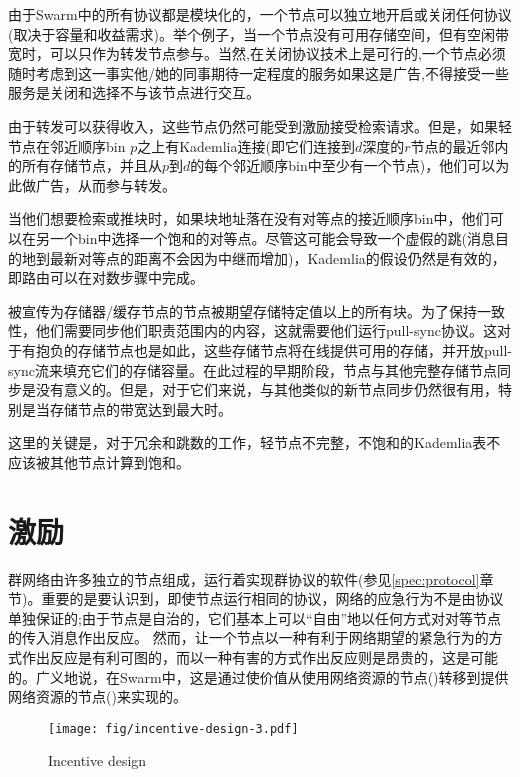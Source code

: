 由于Swarm中的所有协议都是模块化的，一个节点可以独立地开启或关闭任何协议(取决于容量和收益需求)。举个例子，当一个节点没有可用存储空间，但有空闲带宽时，可以只作为转发节点参与。当然,在关闭协议技术上是可行的,一个节点必须随时考虑到这一事实他/她的同事期待一定程度的服务如果这是广告,不得接受一些服务是关闭和选择不与该节点进行交互。 

由于转发可以获得收入，这些节点仍然可能受到激励接受检索请求。但是，如果轻节点在邻近顺序bin $p$之上有Kademlia连接(即它们连接到$d$深度的$r$节点的最近邻内的所有存储节点，并且从$p$到$d$的每个邻近顺序bin中至少有一个节点)，他们可以为此做广告，从而参与转发。 

当他们想要检索或推块时，如果块地址落在没有对等点的接近顺序bin中，他们可以在另一个bin中选择一个饱和的对等点。尽管这可能会导致一个虚假的跳(消息目的地到最新对等点的距离不会因为中继而增加)，Kademlia的假设仍然是有效的，即路由可以在对数步骤中完成。

被宣传为存储器/缓存节点的节点被期望存储特定值以上的所有块。为了保持一致性，他们需要同步他们职责范围内的内容，这就需要他们运行pull-sync协议。这对于有抱负的存储节点也是如此，这些存储节点将在线提供可用的存储，并开放pull-sync流来填充它们的存储容量。在此过程的早期阶段，节点与其他完整存储节点同步是没有意义的。但是，对于它们来说，与其他类似的新节点同步仍然很有用，特别是当存储节点的带宽达到最大时。

这里的关键是，对于冗余和跳数的工作，轻节点不完整，不饱和的Kademlia表不应该被其他节点计算到饱和。


\chapter{激励}\label{sec:incentivisation}
群网络由许多独立的节点组成，运行着实现群协议的软件(参见\ref{spec:protocol}章节)。重要的是要认识到，即使节点运行相同的协议，网络的应急行为不是由协议单独保证的;由于节点是自治的，它们基本上可以“自由”地以任何方式对对等节点的传入消息作出反应。
然而，让一个节点以一种有利于网络期望的紧急行为的方式作出反应是有利可图的，而以一种有害的方式作出反应则是昂贵的，这是可能的。广义地说，在Swarm中，这是通过使价值从使用网络资源的节点()转移到提供网络资源的节点()来实现的。 


\begin{figure}[htbp]
\centering
\texttt{[image: fig/incentive-design-3.pdf]}
\caption[Incentive design \statusgreen]{Incentive design}
\label{fig:incentives}
\end{figure}


